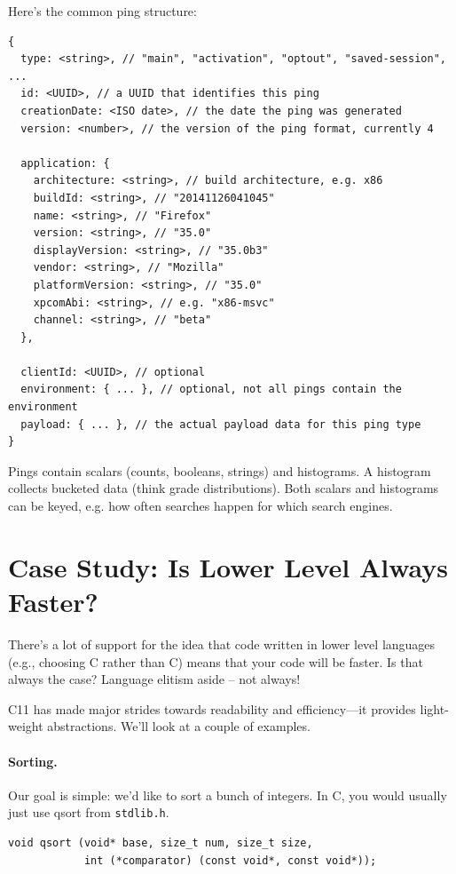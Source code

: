 \documentclass[a4paper]{report}
\newcommand{\CPP}{C\nolinebreak\hspace{-.05em}\raisebox{.4ex}{\tiny\bf +}\nolinebreak\hspace{-.10em}\raisebox{.4ex}{\tiny\bf +}}
\def\CPP{{C\nolinebreak[4]\hspace{-.05em}\raisebox{.4ex}{\tiny\bf ++}}}
\begin{document}
Here's the common ping structure:

\begin{verbatim}
{
  type: <string>, // "main", "activation", "optout", "saved-session", ...
  id: <UUID>, // a UUID that identifies this ping
  creationDate: <ISO date>, // the date the ping was generated
  version: <number>, // the version of the ping format, currently 4

  application: {
    architecture: <string>, // build architecture, e.g. x86
    buildId: <string>, // "20141126041045"
    name: <string>, // "Firefox"
    version: <string>, // "35.0"
    displayVersion: <string>, // "35.0b3"
    vendor: <string>, // "Mozilla"
    platformVersion: <string>, // "35.0"
    xpcomAbi: <string>, // e.g. "x86-msvc"
    channel: <string>, // "beta"
  },

  clientId: <UUID>, // optional
  environment: { ... }, // optional, not all pings contain the environment
  payload: { ... }, // the actual payload data for this ping type
}
\end{verbatim}

Pings contain scalars (counts, booleans, strings) and histograms. A histogram collects
bucketed data (think grade distributions). Both scalars and histograms can be keyed, e.g.
how often searches happen for which search engines.

\section*{Case Study: Is Lower Level Always Faster?}
There's a lot of support for the idea that code written in lower level languages (e.g., choosing C rather than \CPP) means that your code will be faster. Is that always the case? Language elitism aside -- not always!

    \CPP11 has made major strides towards readability and
    efficiency---it provides light-weight abstractions. We'll look at
    a couple of examples.

\paragraph{Sorting.} Our goal is simple: we'd like to sort a bunch of integers.
In C, you would usually just use qsort from {\tt stdlib.h}.

  \begin{lstlisting}
void qsort (void* base, size_t num, size_t size,
            int (*comparator) (const void*, const void*));
  \end{lstlisting}
\end{document}

